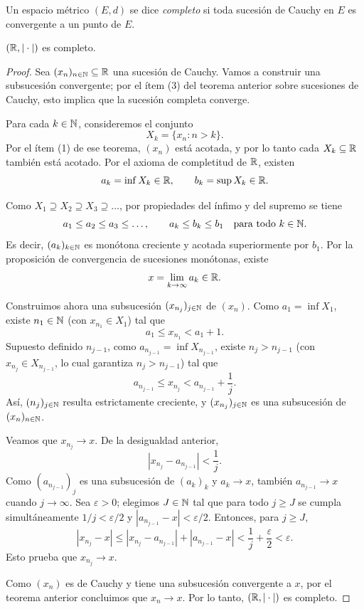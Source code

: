 \begin{defi}
Un espacio métrico $(E,d)$ se dice \emph{completo} si toda sucesión de
Cauchy en $E$ es convergente a un punto de $E$.
\end{defi}

\begin{teo}
$(\mathbb{R}, |\cdot|)$ es completo.
\end{teo}

\begin{proof}
Sea $(x_n)_{n\in\mathbb{N}} \subseteq \mathbb{R}$ una sucesión de Cauchy. Vamos a construir una
subsucesión convergente; por el ítem (3) del teorema anterior sobre sucesiones
de Cauchy, esto implica que la sucesión completa converge.

Para cada $k \in \mathbb{N}$, consideremos el conjunto
\[
X_k = \{x_n : n > k\}.
\]
Por el ítem (1) de ese teorema, $(x_n)$ está acotada, y por lo tanto cada
$X_k \subseteq \mathbb{R}$ también está acotado. Por el axioma de completitud de
$\mathbb{R}$, existen
\[
a_k = \inf X_k \in \mathbb{R}, \qquad b_k = \sup X_k \in \mathbb{R}.
\]

Como $X_1 \supseteq X_2 \supseteq X_3 \supseteq \dots$, por propiedades del
ínfimo y del supremo se tiene
\[
a_1 \le a_2 \le a_3 \le \dots, \qquad a_k \le b_k \le b_1 \quad \text{para todo } k \in \mathbb{N}.
\]
Es decir, $(a_k)_{k\in\mathbb{N}}$ es monótona creciente y acotada superiormente por
$b_1$. Por la proposición de convergencia de sucesiones monótonas, existe
\[
x = \lim_{k\to\infty} a_k \in \mathbb{R}.
\]

Construimos ahora una subsucesión $(x_{n_j})_{j\in\mathbb{N}}$ de $(x_n)$. Como
$a_1 = \inf X_1$, existe $n_1 \in \mathbb{N}$ (con $x_{n_1} \in X_1$) tal que
\[
a_1 \le x_{n_1} < a_1 + 1.
\]
Supuesto definido $n_{j-1}$, como $a_{n_{j-1}} = \inf X_{n_{j-1}}$, existe
$n_j > n_{j-1}$ (con $x_{n_j} \in X_{n_{j-1}}$, lo cual garantiza $n_j >
n_{j-1}$) tal que
\[
a_{n_{j-1}} \le x_{n_j} < a_{n_{j-1}} + \frac{1}{j}.
\]
Así, $(n_j)_{j\in\mathbb{N}}$ resulta estrictamente creciente, y $(x_{n_j})_{j\in\mathbb{N}}$
es una subsucesión de $(x_n)_{n\in\mathbb{N}}$.

Veamos que $x_{n_j} \to x$. De la desigualdad anterior,
\[
|x_{n_j} - a_{n_{j-1}}| < \frac{1}{j}.
\]
Como $(a_{n_{j-1}})_j$ es una subsucesión de $(a_k)_k$ y $a_k \to x$,
también $a_{n_{j-1}} \to x$ cuando $j \to \infty$. Sea $\varepsilon>0$;
elegimos $J \in \mathbb{N}$ tal que para todo $j \ge J$ se cumpla simultáneamente
$1/j < \varepsilon/2$ y $|a_{n_{j-1}} - x| < \varepsilon/2$. Entonces, para
$j \ge J$,
\[
|x_{n_j} - x| \le |x_{n_j} - a_{n_{j-1}}| + |a_{n_{j-1}} - x|
< \frac{1}{j} + \frac{\varepsilon}{2} < \varepsilon.
\]
Esto prueba que $x_{n_j} \to x$.

Como $(x_n)$ es de Cauchy y tiene una subsucesión convergente a $x$, por el
teorema anterior concluimos que $x_n \to x$. Por lo tanto, $(\mathbb{R},|\cdot|)$ es
completo.
\end{proof}

